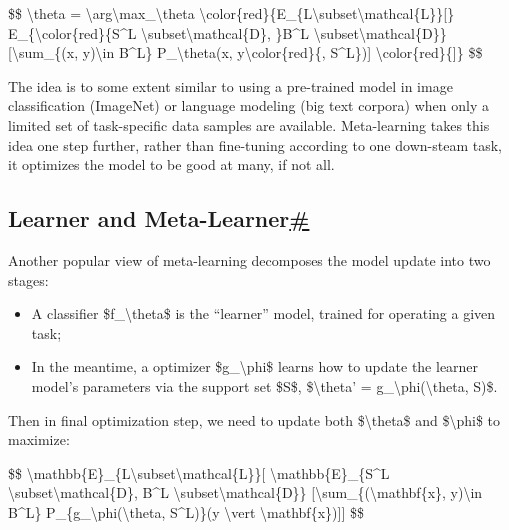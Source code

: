 \$\$ \textbackslash theta = \textbackslash arg\textbackslash max\_\textbackslash theta \textbackslash color\{red\}\{E\_\{L\textbackslash subset\textbackslash mathcal\{L\}\}{[}\} E\_\{\textbackslash color\{red\}\{S\^{}L \textbackslash subset\textbackslash mathcal\{D\}, \}B\^{}L \textbackslash subset\textbackslash mathcal\{D\}\} {[}\textbackslash sum\_\{(x, y)\textbackslash in B\^{}L\} P\_\textbackslash theta(x, y\textbackslash color\{red\}\{, S\^{}L\}){]} \textbackslash color\{red\}\{{]}\} \$\$

The idea is to some extent similar to using a pre-trained model in image classification (ImageNet) or language modeling (big text corpora) when only a limited set of task-specific data samples are available. Meta-learning takes this idea one step further, rather than fine-tuning according to one down-steam task, it optimizes the model to be good at many, if not all.

\subsection{\texorpdfstring{Learner and Meta-Learner\hyperref[learner-and-meta-learner]{\#}}{Learner and Meta-Learner\#}}\label{learner-and-meta-learner}

Another popular view of meta-learning decomposes the model update into two stages:

\begin{itemize}
\tightlist
\item
  A classifier \$f\_\textbackslash theta\$ is the ``learner'' model, trained for operating a given task;
\item
  In the meantime, a optimizer \$g\_\textbackslash phi\$ learns how to update the learner model's parameters via the support set \$S\$, \$\textbackslash theta' = g\_\textbackslash phi(\textbackslash theta, S)\$.
\end{itemize}

Then in final optimization step, we need to update both \$\textbackslash theta\$ and \$\textbackslash phi\$ to maximize:

\$\$ \textbackslash mathbb\{E\}\_\{L\textbackslash subset\textbackslash mathcal\{L\}\}{[} \textbackslash mathbb\{E\}\_\{S\^{}L \textbackslash subset\textbackslash mathcal\{D\}, B\^{}L \textbackslash subset\textbackslash mathcal\{D\}\} {[}\textbackslash sum\_\{(\textbackslash mathbf\{x\}, y)\textbackslash in B\^{}L\} P\_\{g\_\textbackslash phi(\textbackslash theta, S\^{}L)\}(y \textbackslash vert \textbackslash mathbf\{x\}){]}{]} \$\$

